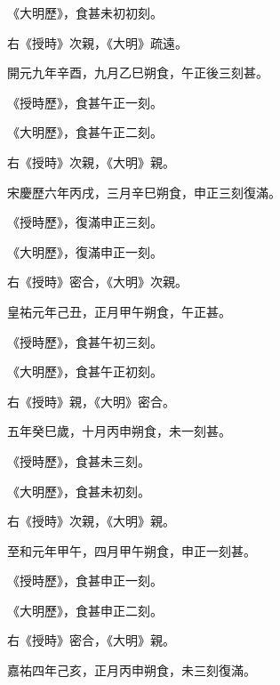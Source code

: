 \begin{pinyinscope}
 《大明歷》，食甚未初初刻。



 右《授時》次親，《大明》疏遠。



 開元九年辛酉，九月乙巳朔食，午正後三刻甚。



 《授時歷》，食甚午正一刻。



 《大明歷》，食甚午正二刻。



 右《授時》次親，《大明》親。



 宋慶歷六年丙戌，三月辛巳朔食，申正三刻復滿。



 《授時歷》，復滿申正三刻。



 《大明歷》，復滿申正一刻。



 右《授時》密合，《大明》次親。



 皇祐元年己丑，正月甲午朔食，午正甚。



 《授時歷》，食甚午初三刻。



 《大明歷》，食甚午正初刻。



 右《授時》親，《大明》密合。



 五年癸巳歲，十月丙申朔食，未一刻甚。



 《授時歷》，食甚未三刻。



 《大明歷》，食甚未初刻。



 右《授時》次親，《大明》親。



 至和元年甲午，四月甲午朔食，申正一刻甚。



 《授時歷》，食甚申正一刻。



 《大明歷》，食甚申正二刻。



 右《授時》密合，《大明》親。



 嘉祐四年己亥，正月丙申朔食，未三刻復滿。




\end{pinyinscope}
